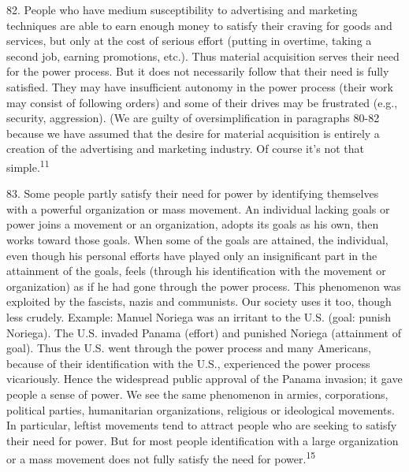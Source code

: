\documentclass{article}
\begin{document}
82. People who have medium susceptibility to advertising and marketing techniques are able to 
earn enough money to satisfy their craving for goods and services, but only at the cost of serious 
effort (putting in overtime, taking a second job, earning promotions, etc.). Thus material 
acquisition serves their need for the power process. But it does not necessarily follow that their 
need is fully satisfied. They may have insufficient autonomy in the power process (their work may 
consist of following orders) and some of their drives may be frustrated (e.g., security, 
aggression). (We are guilty of oversimplification in paragraphs 80-82 because we have assumed 
that the desire for material acquisition is entirely a creation of the advertising and marketing 
industry. Of course it’s not that simple.\textsuperscript{11} \vspace{\baselineskip}

83. Some people partly satisfy their need for power by identifying themselves with a powerful 
organization or mass movement. An individual lacking goals or power joins a movement or an 
organization, adopts its goals as his own, then works toward those goals. When some of the goals 
are attained, the individual, even though his personal efforts have played only an insignificant part 
in the attainment of the goals, feels (through his identification with the movement or organization) 
as if he had gone through the power process. This phenomenon was exploited by the fascists, nazis 
and communists. Our society uses it too, though less crudely. Example: Manuel Noriega was an 
irritant to the U.S. (goal: punish Noriega). The U.S. invaded Panama (effort) and punished Noriega 
(attainment of goal). Thus the U.S. went through the power process and many Americans, because 
of their identification with the U.S., experienced the power process vicariously. Hence the 
widespread public approval of the Panama invasion; it gave people a sense of power. We see the 
same phenomenon in armies, corporations, political parties, humanitarian organizations, religious 
or ideological movements. In particular, leftist movements tend to attract people who are seeking 
to satisfy their need for power. But for most people identification with a large organization or a 
mass movement does not fully satisfy the need for power.\textsuperscript{15} \vspace{\baselineskip} 
\end{document}
